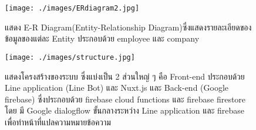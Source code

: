 \begin{figure}
\begin{center}
\texttt{[image: ./images/ERdiagram2.jpg]}
\end{center}
\caption[Poem]{แสดง E-R Diagram(Entity-Relationship Diagram)ซึ่งแสดงรายละเอียดของข้อมูลของแต่ละ Entity ประกอบด้วย employee และ company}
\end{figure}

\begin{figure}
\begin{center}
\texttt{[image: ./images/structure.jpg]}
\end{center}
\caption[Poem]{
  แสดงโครงสร้างของระบบ ซึ่งแบ่งเป็น 2 ส่วนใหญ่ ๆ คือ 
  Front-end ประกอบด้วย Line application (Line Bot) และ Nuxt.js 
  และ Back-end (Google firebase) ซึ่งประกอบด้วย firebase cloud functions และ firebase firestore 
  โดย มี Google dialogflow ขั้นกลางระหว่าง Line application และ firebase เพื่อทำหน้าที่แปลความหมายข้อความ
}
\end{figure}